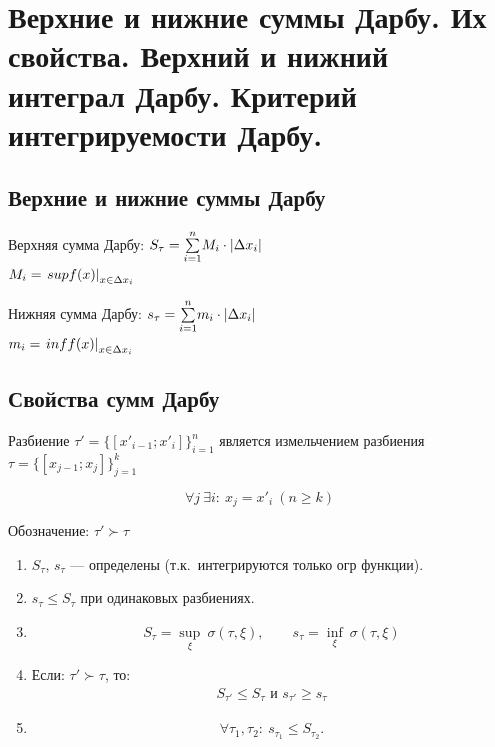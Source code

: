 \section{Верхние и нижние суммы Дарбу. Их свойства. Верхний и нижний интеграл Дарбу. Критерий интегрируемости Дарбу.}

\subsection{Верхние и нижние суммы Дарбу}
\begin{definition}
    Верхняя сумма Дарбу: $S_\tau = \Sum{i = 1}{n}M_i\cdot|\D x_i|$\\
    $M_i = \subs{sup f(x)}{x \in \D x_i}$
\end{definition}

\begin{definition}
    Нижняя сумма Дарбу: $s_\tau = \Sum{i = 1}{n}m_i\cdot|\Delta x_i|$\\
    $m_i = \subs{inf f(x)}{x \in \D x_i}$
\end{definition}

\subsection{Свойства сумм Дарбу}
\begin{definition}
    Разбиение $\tau'=\bigl\{[x'_{i-1};x'_i]\bigr\}_{i=1}^{n}$ является измельчением разбиения $\tau=\bigl\{[x_{j-1};x_j]\bigr\}_{j=1}^{k}$

    \[
        \forall j\ \exists i:\ x_j=x'_i\ (n\ge k)
    \]

    Обозначение: $\tau' \succ \tau$
\end{definition}
\begin{definition}
\noindent
\renewcommand{\labelenumi}{\fbox{\arabic{enumi}}}
\begin{enumerate}
    \item $S_{\tau},\, s_{\tau}$ --- определены
    (т.к.\ интегрируются только огр функции).
    
    \item $s_{\tau}\leq S_{\tau}$ при одинаковых разбиениях.
    
    \item
    \[
    S_{\tau}=\underset{\xi}{\sup}\ \sigma(\tau,\xi),
    \qquad
    s_{\tau}=\underset{\xi}{\inf}\ \sigma(\tau,\xi)
    \]
    \item Если: $\tau' \succ \tau$, то:
    \[
    \begin{aligned}
        S_{\tau'} \leq S_{\tau} \text{ и } s_{\tau'} \geq s_{\tau}
    \end{aligned}
    \]
    
    \item
    \[
    \forall \tau_1,\tau_2:\ s_{\tau_1}\le S_{\tau_2}.
    \]
\end{enumerate}
\end{definition}

